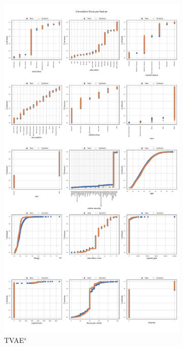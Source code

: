 \begin{landscape}
\begin{figure}[h]
		\hfill
		\begin{subfigure}{0.3\linewidth}
			\includegraphics[height=\textheight,width=\linewidth,keepaspectratio]{images/cumsums/tvae_simTune.jpg}
			\caption{TVAE$^s$}
		\end{subfigure}
		\hfill
		\begin{subfigure}{0.3\linewidth}

\end{subfigure}
\end{figure}
\end{landscape}
